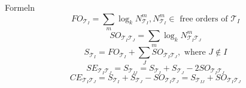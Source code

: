 \documentclass{beamer}
\newcommand{\Tau}{\mathcal{T}}
\begin{document}
\begin{frame}{Formeln}
	\begin{equation}
		FO_{\Tau_I}=\sum\limits_m \log_k N_{\Tau_I}^m, N_{\Tau_I}^m \in \text{ free orders of } \Tau_I 
	\end{equation}
	\begin{equation}
		SO_{\Tau_I\Tau_J}=\sum\limits_m \log_k N_{\Tau_I\Tau_J}^m 
	\end{equation}
	\begin{equation}
		S_{\Tau_I}=FO_{\Tau_I}+\sum\limits_J SO_{\Tau_I\Tau_J}, \text{ where } J\notin I
	\end{equation}
	\begin{equation}
		SE_{\Tau_I\Tau_J}=S_{\Tau_{IJ}}=S_{\Tau_I}+S_{\Tau_J}-2SO_{\Tau_I\Tau_J}
	\end{equation}
	\begin{equation}
		CE_{\Tau_I\Tau_J}=S_{\Tau_I}+S_{\Tau_J}-SO_{\Tau_I\Tau_J}=S_{\Tau_{IJ}}+SO_{\Tau_I\Tau_J}
	\end{equation}
\end{frame}
\end{document}
